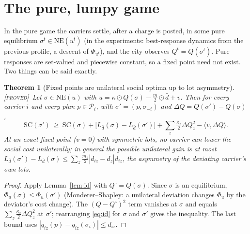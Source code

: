 \documentclass[11pt]{article}
\newtheorem{theorem}{Theorem}
\theoremstyle{definition}
\theoremstyle{remark}
\newcommand{\cP}{\mathcal{P}}
\newcommand{\ip}[2]{\langle #1,#2\rangle}
\newcommand{\dbar}{\bar d}
\newcommand{\SC}{\mathrm{SC}}
\newcommand{\NE}{\mathrm{NE}}
\newcommand{\PROVED}{{\normalfont\textsc{[proved]}}}
\begin{document}
\section{The pure, lumpy game}\label{sec:pure}

In the pure game the carriers settle, after a charge is posted, in some pure equilibrium $\sigma^t\in\NE(u^t)$ (in the experiments: best-response dynamics from the previous profile, a descent of $\Phi_{u^t}$), and the city observes $Q^t=Q(\sigma^t)$. Pure responses are set-valued and piecewise constant, so a fixed point need not exist. Two things can be said exactly.

\begin{theorem}[Fixed points are unilateral social optima up to lot asymmetry]\label{thm:purefixed}\PROVED\
Let $\sigma\in\NE(u)$ with $u=\kappa\odot Q(\sigma)-\tfrac m2\odot\dbar+v$. Then for every carrier $i$ and every plan $p\in\cP_i$, with $\sigma'=(p,\sigma_{-i})$ and $\Delta Q=Q(\sigma')-Q(\sigma)$,
\[\SC(\sigma')\ \ge\ \SC(\sigma)+\big[L_{\dbar}(\sigma)-L_{\dbar}(\sigma')\big]+\sum_z\tfrac{\kappa_z}{2}\Delta Q_z^2-\ip{v}{\Delta Q}.\]
At an exact fixed point ($v=0$) with symmetric lots, no carrier can lower the social cost unilaterally; in general the possible unilateral gain is at most $L_{\dbar}(\sigma')-L_{\dbar}(\sigma)\le\sum_z\tfrac{m_z}{2}|d_{iz}-\dbar_z|d_{iz}$, the asymmetry of the deviating carrier's own lots.
\end{theorem}
\begin{proof}
Apply Lemma~\ref{lem:id} with $Q^\circ=Q(\sigma)$. Since $\sigma$ is an equilibrium, $\Phi_u(\sigma)\le\Phi_u(\sigma')$ (Monderer--Shapley: a unilateral deviation changes $\Phi_u$ by the deviator's cost change). The $(Q-Q^\circ)^2$ term vanishes at $\sigma$ and equals $\sum_z\tfrac{\kappa_z}{2}\Delta Q_z^2$ at $\sigma'$; rearranging \eqref{eq:id} for $\sigma$ and $\sigma'$ gives the inequality. The last bound uses $|q_{iz}(p)-q_{iz}(\sigma_i)|\le d_{iz}$.
\end{proof}
\end{document}
